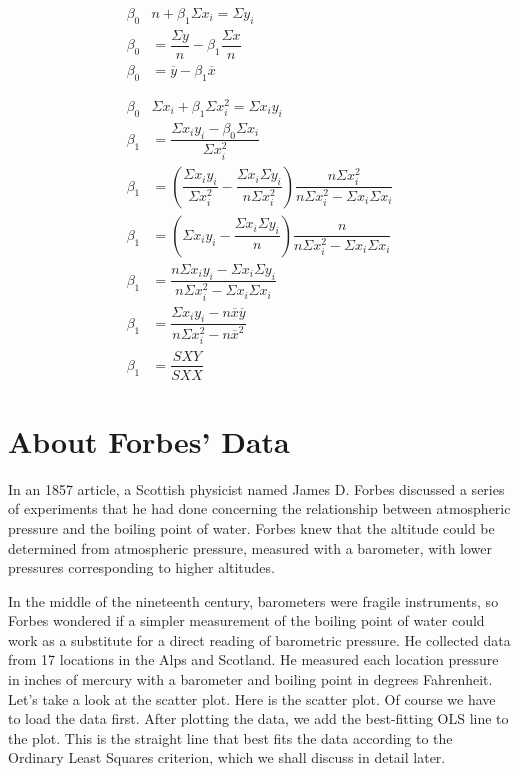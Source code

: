 \documentclass{article}
\begin{document}
    \begin{align} 
        \beta_{0} &n + \beta_{1} \Sigma x_{i} = \Sigma y_{i}                \nonumber \\
        \beta_{0} &= \dfrac {\Sigma y}{n} - \beta_{1}  \dfrac {\Sigma x}{n} \nonumber \\
        \beta_{0} &= \overline{y} - \beta_{1}  \overline{x}                 \\
        \nonumber \\
        \nonumber \\
        \beta_{0} &\Sigma x_{i} + \beta_{1} \Sigma x_{i}^2 = \Sigma x_{i} y_{i} \nonumber \\
        \beta_{1} &= \dfrac{\Sigma x_{i}y_{i} - \beta _{0} \Sigma x_{i} }{ \Sigma x_{i}^2} \nonumber \\
        \beta_{1} &= \left ( \dfrac{\Sigma x_{i}y_{i}}{\Sigma x_{i}^2} - \dfrac{\Sigma x_{i} \Sigma y_{i}}{n \Sigma x_{i}^2} \right ) 
        \dfrac{n \Sigma x_{i}^2}{n\Sigma x_{i}^2 - \Sigma x_{i} \Sigma x_{i}} \nonumber \\
        \beta_{1} &= \left ( \Sigma x_{i}y_{i} - \dfrac{\Sigma x_{i} \Sigma y_{i}}{n} \right ) 
        \dfrac{n}{n\Sigma x_{i}^2 - \Sigma x_{i} \Sigma x_{i}} \nonumber \\
        \beta_{1} &= \dfrac{n \Sigma x_{i} y_{i} - \Sigma x_{i} \Sigma y_{i}}{n \Sigma x_{i}^2 - \Sigma x_{i} \Sigma x_{i}} \nonumber \\
        \beta_{1} &= \dfrac{\Sigma x_{i} y_{i} - n \overline{x} \overline{y}}{n \Sigma x_{i}^2 - n \overline{x}^2} \nonumber \\
        \beta_{1} &= \dfrac{SXY}{SXX}
    \end{align}
    
\section {About Forbes' Data}
    
    In an 1857 article, a Scottish physicist named James D. Forbes discussed a series of experiments that he had done concerning the relationship between atmospheric pressure and the boiling point of water. Forbes knew that the altitude could be determined from atmospheric pressure, measured with a barometer, with lower pressures corresponding to higher altitudes.
    
    In the middle of the nineteenth century, barometers were fragile instruments, so Forbes wondered if a simpler measurement of the boiling point of water could work as a substitute for a direct reading of barometric pressure. He collected data from 17 locations in the Alps and Scotland. He measured each location pressure in inches of mercury with a barometer and boiling point in degrees Fahrenheit. Let’s take a look at the scatter plot. Here is the scatter plot. %
    Of course we have to load the data first. After plotting the data, we add the best-fitting OLS line to the plot. This is the straight line that best fits the data according to the Ordinary Least Squares criterion, which we shall discuss in detail later.
    
\end{document}
